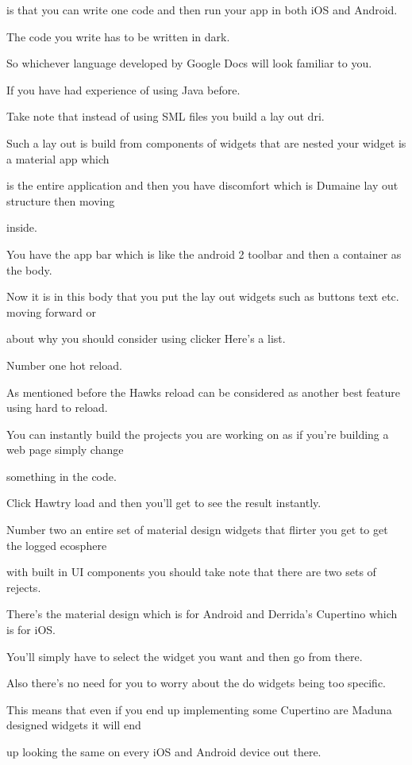 is that you can write one code and then run your app in both iOS and Android.

The code you write has to be written in dark.

So whichever language developed by Google Docs will look familiar to you.

If you have had experience of using Java before.

Take note that instead of using SML files you build a lay out dri.

Such a lay out is build from components of widgets that are nested your widget is a material app which

is the entire application and then you have discomfort which is Dumaine lay out structure then moving

inside.

You have the app bar which is like the android 2 toolbar and then a container as the body.

Now it is in this body that you put the lay out widgets such as buttons text etc. moving forward or

about why you should consider using clicker Here's a list.

Number one hot reload.

As mentioned before the Hawks reload can be considered as another best feature using hard to reload.

You can instantly build the projects you are working on as if you're building a web page simply change

something in the code.

Click Hawtry load and then you'll get to see the result instantly.

Number two an entire set of material design widgets that flirter you get to get the logged ecosphere

with built in UI components you should take note that there are two sets of rejects.

There's the material design which is for Android and Derrida's Cupertino which is for iOS.

You'll simply have to select the widget you want and then go from there.

Also there's no need for you to worry about the do widgets being too specific.

This means that even if you end up implementing some Cupertino are Maduna designed widgets it will end

up looking the same on every iOS and Android device out there.

